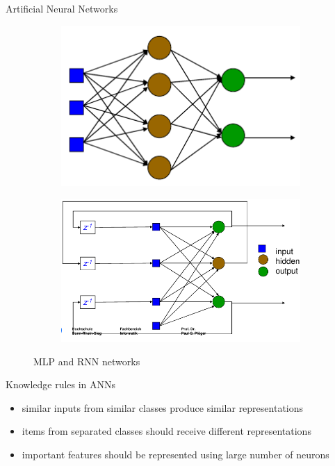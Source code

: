 \documentclass[9pt,t]{beamer}
\begin{document}
\begin{frame}{Artificial Neural Networks}
    \begin{figure}[htp!]
        \centering
        \begin{subfigure}{.5\textwidth}
            \centering
            \includegraphics[width=.7\linewidth]{mlp.png}
        \end{subfigure}%
        \begin{subfigure}{.5\textwidth}
            \centering
            \includegraphics[width=\linewidth]{rnn.png}
        \end{subfigure}
        \caption{MLP and RNN networks}
    \end{figure}
    \begin{alertblock}{Knowledge rules in ANNs}
        \begin{itemize}
            \item similar inputs from similar classes produce similar representations
            \item items from separated classes should receive different representations
            \item important features should be represented using large number of neurons

\end{itemize}
\end{alertblock}
\end{frame}
\end{document}
